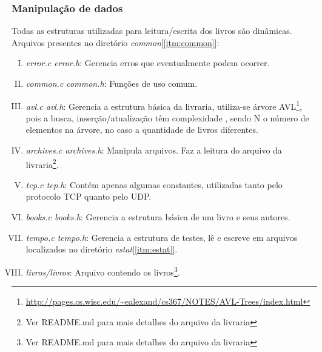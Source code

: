\documentclass[a4paper,10pt]{article}
\begin{document}
\subsubsection{Manipulação de dados}
Todas as estruturas utilizadas para leitura/escrita dos livros são dinâmicas. \\Arquivos presentes no diretório \emph{common}[\ref{itm:common}]:
\begin{enumerate}[I.]
\item \emph{error.c error.h}: Gerencia erros que eventualmente podem ocorrer.
\item \emph{common.c common.h}: Funções de uso comum.
\item \label{itm:avl} \emph{avl.c avl.h}: Gerencia a estrutura básica da livraria, utiliza-se 
árvore AVL\footnote{ \url{http://pages.cs.wisc.edu/~ealexand/cs367/NOTES/AVL-Trees/index.html} }, pois a busca, inserção/atualização têm complexidade  , sendo N
o número de elementos na árvore, no caso a quantidade de livros diferentes.
\item \emph{archives.c archives.h}: Manipula arquivos. Faz a leitura do arquivo
da livraria\footnote{Ver README.md para mais detalhes do arquivo da livraria}.
\item \label{itm:tcp} \emph{tcp.c tcp.h}: Contém apenas algumas constantes, utilizadas tanto pelo protocolo TCP quanto pelo UDP.
\item \emph{books.c books.h}: Gerencia a estrutura básica de um livro e seus autores.
\item \label{itm:tempo}\emph{tempo.c tempo.h}: Gerencia a estrutura de testes, lê e escreve em arquivos localizados no diretório \emph{estat}[\ref{itm:estat}].
\item \emph{livros/livros}: Arquivo contendo os livros\footnote{Ver README.md para mais detalhes do arquivo da livraria}.
\end{enumerate}
\end{document}

